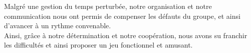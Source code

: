 			Malgré une gestion du temps perturbée, notre organisation et notre communication nous ont permis de compenser les défauts du groupe, et ainsi d'avancer à un rythme convenable. \\
			Ainsi, grâce à notre détermination et notre coopération, nous avons su franchir les difficultés et ainsi proposer un jeu fonctionnel et amusant.
